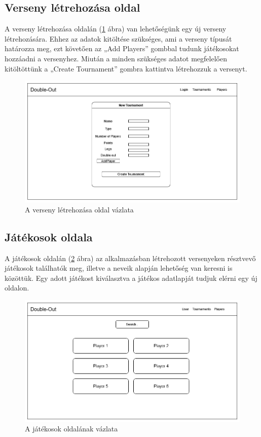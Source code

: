 \subsection{Verseny létrehozása oldal}
A verseny létrehozása oldalán (\ref{fig:newTournament} ábra) van lehetőségünk egy új verseny létrehozására. Ehhez az adatok kitöltése szükséges, ami a verseny típusát határozza meg, ezt követően az „Add Players” gombbal tudunk játékosokat hozzáadni a versenyhez. Miután a minden szükséges adatot megfelelően kitöltöttünk a „Create Tournament” gombra kattintva létrehozzuk a versenyt.

\begin{figure}[h]
\centering
\includegraphics[scale=0.5]{images/NewTournament.png}
\caption{A verseny létrehozása oldal vázlata}
\label{fig:newTournament}
\end{figure}

\subsection{Játékosok oldala}
A játékosok oldalán (\ref{fig:players} ábra) az alkalmazásban létrehozott versenyeken résztvevő játékosok találhatók meg, illetve a neveik alapján lehetőség van keresni is közöttük. Egy adott játékost kiválasztva a játékos adatlapját tudjuk elérni egy új oldalon.

\begin{figure}[h]
\centering
\includegraphics[scale=0.5]{images/PlayersPage.png}
\caption{A játékosok oldalának vázlata}
\label{fig:players}
\end{figure}

